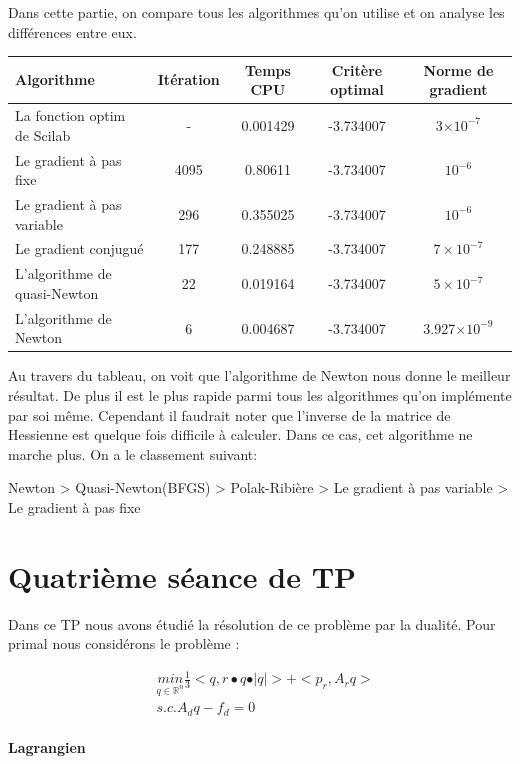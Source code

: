 Dans cette partie, on compare tous les algorithmes qu'on utilise et on analyse les différences entre eux.

\begin{center}
    \begin{tabular}{| l | c | c | c | c |}
    \hline
    Algorithme & Itération & Temps CPU & Critère optimal & Norme de gradient \\ \hline
    La fonction optim de Scilab & - & 0.001429 & -3.734007 & 3$\times 10^{-7}$\\ \hline  
    Le gradient à pas fixe & 4095 & 0.80611 & -3.734007 & $10^{-6}$ \\ \hline
    Le gradient à pas variable  & 296 & 0.355025 & -3.734007 & $10^{-6}$\\ \hline
    Le gradient conjugué  & 177 & 0.248885 & -3.734007 & $7\times 10^{-7}$\\ \hline
    L'algorithme de quasi-Newton & 22 & 0.019164& -3.734007 & $5\times 10^{-7}$\\ \hline
    L'algorithme de Newton & 6 & 0.004687 & -3.734007 & 3.927$\times 10^{-9}$\\ 
    \hline
    \end{tabular}
\end{center}

Au travers du tableau, on voit que l'algorithme de Newton nous donne le meilleur résultat. De plus il est le plus rapide parmi tous les algorithmes qu'on implémente par soi même. Cependant il faudrait noter que l'inverse de la matrice de Hessienne est quelque fois difficile à calculer. Dans ce cas, cet algorithme ne marche plus. On a le classement suivant:

Newton > Quasi-Newton(BFGS) > Polak-Ribière > Le gradient à pas variable > Le gradient à pas fixe

\section{Quatrième séance de TP}

Dans ce TP nous avons étudié la résolution de ce problème par la dualité. Pour primal nous considérons le problème : 

\begin{align}
  &{ \underset{q\in \mathbb{R}^n}{min} \frac{1}{3} <q, r \bullet q \bullet \vert q\vert> + <p_r, A_rq> }\\
  \nonumber &s.c. A_d q - f_d = 0
\end{align}

\paragraph{Lagrangien}

